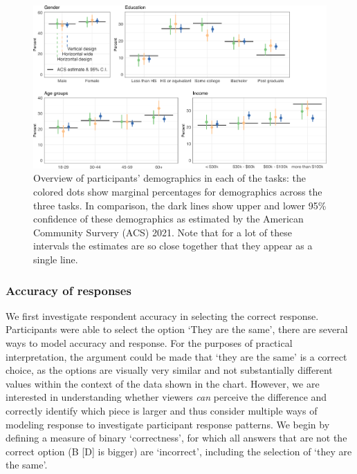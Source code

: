\documentclass[
]{jds}
\begin{document}
\begin{figure}[hbt]

{\centering \includegraphics{./figures/fig-rounds-demographics-1.png}

}

\caption{\label{fig-rounds-demographics}Overview of participants'
demographics in each of the tasks: the colored dots show marginal
percentages for demographics across the three tasks. In comparison, the
dark lines show upper and lower 95\% confidence of these demographics as
estimated by the American Community Survery (ACS) 2021. Note that for a
lot of these intervals the estimates are so close together that they
appear as a single line.}

\end{figure}

\hypertarget{accuracy-of-responses}{%
\subsubsection{Accuracy of responses}\label{accuracy-of-responses}}

We first investigate respondent accuracy in selecting the correct
response. Participants were able to select the option `They are the
same', there are several ways to model accuracy and response. For the
purposes of practical interpretation, the argument could be made that
`they are the same' is a correct choice, as the options are visually
very similar and not substantially different values within the context
of the data shown in the chart. However, we are interested in
understanding whether viewers \emph{can} perceive the difference and
correctly identify which piece is larger and thus consider multiple ways
of modeling response to investigate participant response patterns. We
begin by defining a measure of binary `correctness', for which all
answers that are not the correct option (B {[}D{]} is bigger) are
`incorrect', including the selection of `they are the same'.
\end{document}
